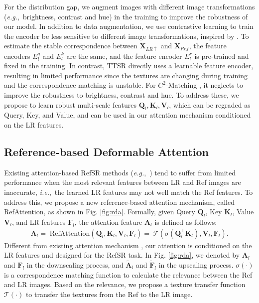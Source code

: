 \documentclass[runningheads]{llncs}
\def\ie{\mbox{\textit{i.e.}, }}
\def\eg{\mbox{\textit{e.g.}, }}
\def\mT{{\mathcal T}}
\def\bA{{\bm{A}}}
\def\bF{{\bm{F}}}
\def\bK{{\bm{K}}}
\def\bQ{{\bm{Q}}}
\def\bV{{\bm{V}}}
\def\bX{{\bm{X}}}
\def\Attention{{\mathrm{Attention}}}
\def\Ref{{\mathrm{Ref}}}
\begin{document}
For the distribution gap, we augment images with different image transformations (\eg brightness, contrast and hue) in the training to improve the robustness of our model.
In addition to data augmentation, we use contrastive learning to train the encoder be less sensitive to different image transformations, inspired by \cite{jiang2021robust}.
To estimate the stable correspondence between $\bX_{LR\uparrow}$ and $\bX_{Ref}$, the feature encoders $E_{l}^q$ and $E_{l}^k$ are the same, and the feature encoder $E_l^r$ is pre-trained and fixed in the training.
In contrast, TTSR \cite{yang2020learning} directly uses a learnable feature encoder, resulting in limited performance since the textures are changing during training and the correspondence matching is unstable.
For $C^2$-Matching \cite{jiang2021robust}, it neglects to improve the robustness to brightness, contrast and hue.
To address these, we propose to learn robust multi-scale features $\bQ_l, \bK_l, \bV_l$, which can be regraded as Query, Key, and Value, and can be used in our attention mechanism conditioned on the LR features. 

\subsection{Reference-based Deformable Attention} 

Existing attention-based RefSR methods (\eg \cite{yang2020learning}) tend to suffer from limited performance when the most relevant features between LR and Ref images are inaccurate, \ie the learned LR features may not well match the Ref features. 
To address this, we propose a new reference-based attention mechanism, called RefAttention, as shown in Fig. \ref{fig:rda}.
Formally, given Query $\bQ_l$, Key $\bK_l$, Value $\bV_l$, and LR features $\bF_l$, the attention feature $\bA_l$ is defined as follows:
\begin{equation}
\begin{aligned}
    \bA_l = \; \Ref\Attention(\bQ_l, \bK_l, \bV_l, \bF_l) 
    =\; \mT \left( \sigma \left( \bQ^{\top}_l\! \bK_l \right), \bV_l, \bF_l \right).
\end{aligned}
\end{equation}
Different from existing attention mechanism \cite{vaswani2017attention}, our attention is conditioned on the LR features and designed for the RefSR task.
In Fig. \ref{fig:rda}, we denoted by $\bA_l$ and $\bF_l$ in the downscaling process, and $\tilde{\bA}_l$ and $\tilde{\bF}_l$ in the upscaling process.
$\sigma(\cdot)$ is a correspondence matching function to calculate the relevance between the Ref and LR images.
Based on the relevance, we propose a texture transfer function $\mT(\cdot)$ to transfer the textures from the Ref to the LR image.
\end{document}
